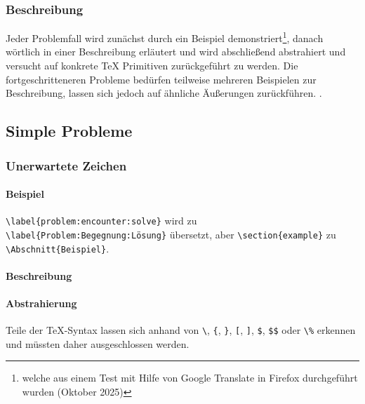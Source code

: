 \subsubsection{Beschreibung}
Jeder Problemfall wird zunächst durch ein Beispiel demonstriert\footnote{welche aus einem Test mit Hilfe von Google Translate in Firefox durchgeführt wurden (Oktober 2025)}, danach wörtlich in einer Beschreibung erläutert und wird abschließend abstrahiert und versucht auf konkrete \TeX{} Primitiven zurückgeführt zu werden. Die fortgeschritteneren Probleme bedürfen teilweise mehreren Beispielen zur Beschreibung, lassen sich jedoch auf ähnliche Äußerungen zurückführen. .

\subsection{Simple Probleme}\label{problems:simple}
\subsubsection{Unerwartete Zeichen}\label{problems:unexpectedCharacters}
\paragraph*{Beispiel}
\verb|\label{problem:encounter:solve}| wird zu \verb|\label{Problem:Begegnung:Lösung}| übersetzt, aber \verb|\section{example}| zu \verb|\Abschnitt{Beispiel}|.
\paragraph*{Beschreibung}
\paragraph*{Abstrahierung}
Teile der \TeX{}-Syntax lassen sich anhand von \verb|\|, \verb|{|, \verb|}|, \verb|[|, \verb|]|, \verb|$|, \verb|$$| oder \verb|\%| erkennen und müssten daher ausgeschlossen werden.


